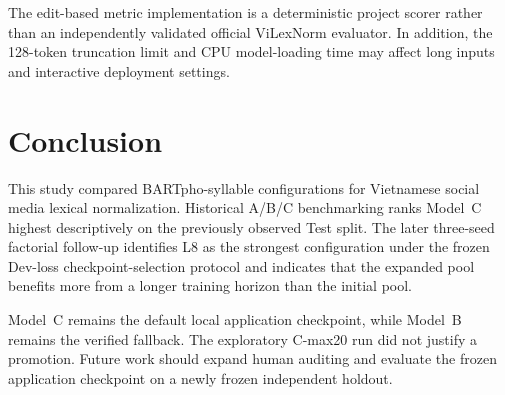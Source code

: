 \documentclass[11pt]{article}
\begin{document}
The edit-based metric implementation is a deterministic project scorer rather than an independently validated official ViLexNorm evaluator. In addition, the 128-token truncation limit and CPU model-loading time may affect long inputs and interactive deployment settings.

\section{Conclusion}

This study compared BARTpho-syllable configurations for Vietnamese social media lexical normalization. Historical A/B/C benchmarking ranks Model~C highest descriptively on the previously observed Test split. The later three-seed factorial follow-up identifies L8 as the strongest configuration under the frozen Dev-loss checkpoint-selection protocol and indicates that the expanded pool benefits more from a longer training horizon than the initial pool.

Model~C remains the default local application checkpoint, while Model~B remains the verified fallback. The exploratory C-max20 run did not justify a promotion. Future work should expand human auditing and evaluate the frozen application checkpoint on a newly frozen independent holdout.



\end{document}
